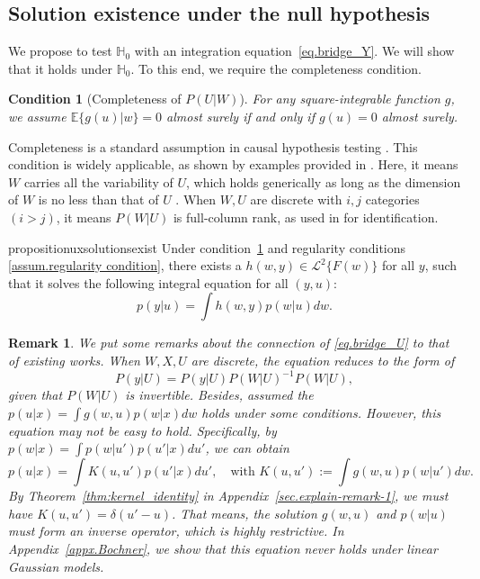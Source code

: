 \documentclass[
  12pt]{article}
\newtheorem{assumption}{Condition}
\newtheorem{remark}{Remark}
\def\mH{\mathbb{H}}
\def\cL{\mathcal{L}}
\begin{document}
\subsection{Solution existence under the null hypothesis}\label{sec. null hypothesis}

We propose to test $\mH_0$ with an integration equation~\eqref{eq.bridge_Y}. We will show that it holds under $\mH_0$. To this end, we require the completeness condition. 


\begin{assumption}[Completeness of $P(U|W)$]
\label{assum.completeness}
     For any square-integrable function $g$, we assume $\mathbb{E}\{g(u)|w\} = 0$ almost surely if and only if $g(u) = 0$ almost surely.
\end{assumption}
Completeness is a standard assumption in causal hypothesis testing \citep{miao2018identifying,miao2023identifying,liu2023causal}. This condition is widely applicable, as shown by examples provided in \citep{newey2003instrumental,d2011completeness, hu2018nonparametric,andrews2017examples}. Here, it means $W$ carries all the variability of $U$, which holds generically as long as the dimension of $W$ is no less than that of $U$ \citep{andrews2017examples}. When $W,U$ are discrete with $i,j$ categories $(i>j)$, it means $P(W|U)$ is full-column rank, as used in \cite{liu2023causal} for identification. 
\begin{restatable}{proposition}{uxsolutionsexist}    \label{prop.bridge_U}
    Under condition~\ref{assum.completeness} and regularity conditions \ref{assum.regularity condition}, there exists a $h(w,y) \in \cL^2\{F(w)\}$ for all $y$, such that it solves the following integral equation for all $(y,u)$:
    \begin{equation}
    \label{eq.bridge_U}
        p(y|u) = \int h(w,y)p(w|u)dw. 
    \end{equation}
\end{restatable}
\begin{remark}
\label{remark.icml}
    We put some remarks about the connection of \eqref{eq.bridge_U} to that of existing works. When $W,X,U$ are discrete, the equation reduces to the form of 
    $$
    P(y|U) = P(y|U)P(W|U)^{-1}P(W|U),
    $$ 
    given that $P(W|U)$ is invertible. Besides, \cite{wubivariate} assumed the $p(u|x)=\int g(w,u)p(w|x)dw$ holds under some conditions. However, this equation may not be easy to hold. Specifically, by $p(w|x)=\int p(w|u')p(u'|x)du'$, we can obtain
    $$
    p(u|x) = \int K(u,u') p(u'|x) du', \quad \text{with } K(u,u') := \int g(w,u) p(w|u') dw.
    $$
    By Theorem~\ref{thm:kernel_identity} in Appendix~\ref{sec.explain-remark-1}, we must have $K(u,u')=\delta(u'-u)$. That means, the solution $g(w,u)$ and $p(w|u)$ must form an inverse operator, which is highly restrictive. In Appendix~\ref{appx.Bochner}, we show that this equation never holds under linear Gaussian models.
\end{remark}
\end{document}
